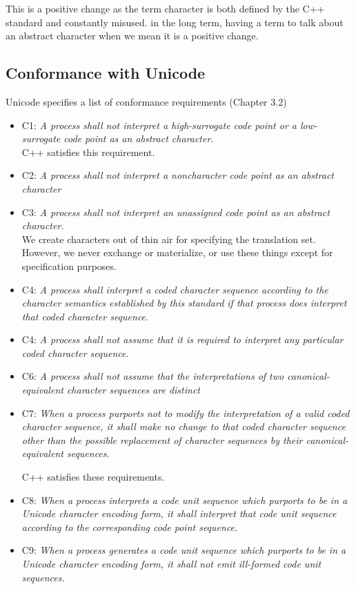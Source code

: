 \documentclass{wg21}
\begin{document}
This is a positive change as the term character is both defined by the C++ standard and constantly misused.
in the long term, having a term to talk about an abstract character when we mean it is a positive change.

\subsection{Conformance with Unicode}

Unicode specifies a list of conformance requirements (Chapter 3.2)

\begin{itemize}
    \item C1: \emph{A process shall not interpret a high-surrogate code point or a low-surrogate code point as an abstract character.}\\
    C++ satisfies this requirement.

    \item C2: \emph{A process shall not interpret a noncharacter code point as an abstract character}
    \item C3: \emph{A process shall not interpret an unassigned code point as an abstract character.}\\

    We create characters out of thin air for specifying the translation set.
    However, we never exchange or materialize, or use these things except for specification purposes.

    \item C4: \emph{A process shall interpret a coded character sequence according to the character semantics established by this standard if that process does interpret that coded character sequence.}
    \item C4: \emph{A process shall not assume that it is required to interpret any particular coded character sequence.}
    \item C6: \emph{A process shall not assume that the interpretations of two canonical-equivalent character sequences are distinct}
    \item C7: \emph{When a process purports not to modify the interpretation of a valid coded character
        sequence, it shall make no change to that coded character sequence other than the possible replacement of character sequences by their canonical-equivalent sequences.}

    C++ satisfies these requirements.

    \item C8: \emph{When a process interprets a code unit sequence which purports to be in a Unicode
        character encoding form, it shall interpret that code unit sequence according to the
        corresponding code point sequence.}
    \item C9: \emph{When a process generates a code unit sequence which purports to be in a Unicode
        character encoding form, it shall not emit ill-formed code unit sequences.}


\end{itemize}
\end{document}
